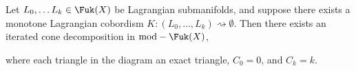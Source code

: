 
Let $L_0, \ldots L_k\in \Fuk(X)$ be Lagrangian submanifolds, and suppose there exists a monotone Lagrangian cobordism $K: (L_0, \ldots, L_k)\rightsquigarrow \emptyset$. Then there exists an iterated cone decomposition in $\text{mod}-\Fuk(X)$,

where each triangle in the diagram an exact triangle, $C_0=0$, and $C_k=k$.